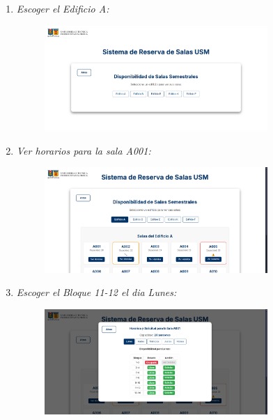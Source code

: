 \documentclass{article}
\begin{document}
\begin{enumerate}
\begin{enumerate}
            \item \textit{Escoger el Edificio A:}
            \begin{figure}[H] 
                \centering 
                \includegraphics[width=0.8\textwidth]{IMG/ss10.png} 
            \end{figure}

            \newpage
            \item \textit{Ver horarios para la sala A001:}
            \begin{figure}[H] 
                \centering 
                \includegraphics[width=0.8\textwidth]{IMG/ss11.png} 
            \end{figure}

            \item  \textit{Escoger el Bloque 11-12 el dia Lunes:}
            \begin{figure}[H] 
                \centering 
                \includegraphics[width=0.8\textwidth]{IMG/ss12.png} 
            \end{figure}


\end{enumerate}
\end{enumerate}
\end{document}
